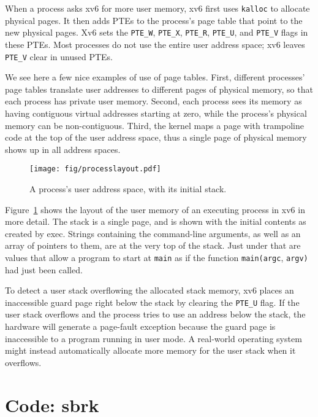 When a process asks xv6 for more user memory,
xv6 first uses {\tt kalloc} to allocate physical pages.
It then adds PTEs to the process's page table that point
to the new physical pages.
Xv6 sets the
\lstinline{PTE_W},
\lstinline{PTE_X},
\lstinline{PTE_R},
\lstinline{PTE_U},
and
\lstinline{PTE_V}
flags in these PTEs.
Most processes do not use the entire user address space;
xv6 leaves
\lstinline{PTE_V}
clear in unused PTEs.

We see here a few nice examples of use of page tables.  First,
different processes' page tables translate user addresses to different
pages of physical memory, so that each process has private user
memory.  Second, each process sees its memory as having contiguous
virtual addresses starting at zero, while the process's physical
memory can be non-contiguous.  Third, the kernel maps a page with
trampoline code at the top of
the user address space, thus a single page of physical memory
shows up in all address spaces.

\begin{figure}[t]
\center
\texttt{[image: fig/processlayout.pdf]}
\caption{A process's user address space, with its initial stack.}
\label{fig:processlayout}
\end{figure}

Figure~\ref{fig:processlayout} shows the layout of the user memory of
an executing process in xv6 in more detail.  The stack is a single
page, and is shown with the initial contents as created by exec.
Strings containing the command-line arguments, as well as an array of
pointers to them, are at the very top of the stack.  Just under that
are values that allow a program to start at \lstinline{main} as if the
function \lstinline{main(argc}, \lstinline{argv)} had just
been called.

To detect a user stack overflowing the allocated stack memory, xv6
places an inaccessible guard page right below the stack by clearing
the \lstinline{PTE_U} flag. If the user stack overflows and the process tries
to use an address below the stack, the hardware will generate a
page-fault exception because the guard page is inaccessible to a
program running in user mode. A real-world operating system might
instead automatically allocate more memory for the user stack when it
overflows.

\section{Code: sbrk}

